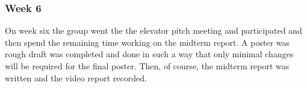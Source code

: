 \subsubsection{Week 6}
On week six the group went the the elevator pitch meeting and participated and then spend the remaining time working on the midterm report.
A poster was rough draft was completed and done in such a way that only minimal changes will be required for the final poster.
Then, of course, the midterm report was written and the video report recorded.










